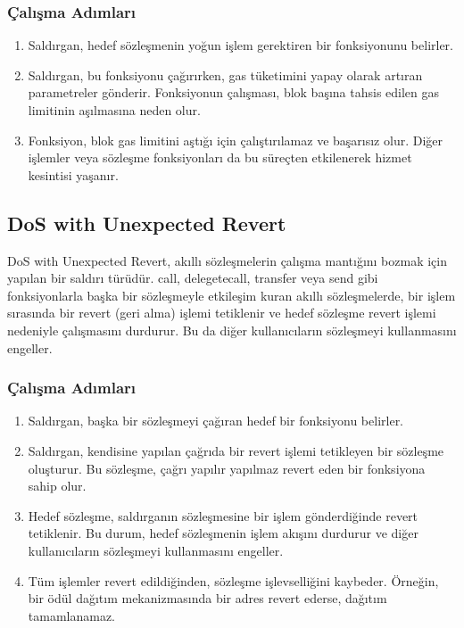 \subsubsection{Çalışma Adımları}

\begin{enumerate}
    \item Saldırgan, hedef sözleşmenin yoğun işlem gerektiren bir fonksiyonunu belirler.
    \item Saldırgan, bu fonksiyonu çağırırken, gas tüketimini yapay olarak artıran parametreler gönderir. Fonksiyonun çalışması, blok başına tahsis edilen gas limitinin aşılmasına neden olur.
    \item Fonksiyon, blok gas limitini aştığı için çalıştırılamaz ve başarısız olur. Diğer işlemler veya sözleşme fonksiyonları da bu süreçten etkilenerek hizmet kesintisi yaşanır.
\end{enumerate}

\newpage

\subsection{DoS with Unexpected Revert}

DoS with Unexpected Revert, akıllı sözleşmelerin çalışma mantığını bozmak için yapılan bir saldırı türüdür. call, delegetecall, transfer veya send gibi fonksiyonlarla başka bir sözleşmeyle etkileşim kuran akıllı sözleşmelerde, bir işlem sırasında bir revert (geri alma) işlemi tetiklenir ve hedef sözleşme revert işlemi nedeniyle çalışmasını durdurur. Bu da diğer kullanıcıların sözleşmeyi kullanmasını engeller.

\subsubsection{Çalışma Adımları}

\begin{enumerate}
    \item Saldırgan, başka bir sözleşmeyi çağıran hedef bir fonksiyonu belirler.
    \item Saldırgan, kendisine yapılan çağrıda bir revert işlemi tetikleyen bir sözleşme oluşturur. Bu sözleşme, çağrı yapılır yapılmaz revert eden bir fonksiyona sahip olur.
    \item Hedef sözleşme, saldırganın sözleşmesine bir işlem gönderdiğinde revert tetiklenir. Bu durum, hedef sözleşmenin işlem akışını durdurur ve diğer kullanıcıların sözleşmeyi kullanmasını engeller.
    \item Tüm işlemler revert edildiğinden, sözleşme işlevselliğini kaybeder. Örneğin, bir ödül dağıtım mekanizmasında bir adres revert ederse, dağıtım tamamlanamaz.
\end{enumerate}

